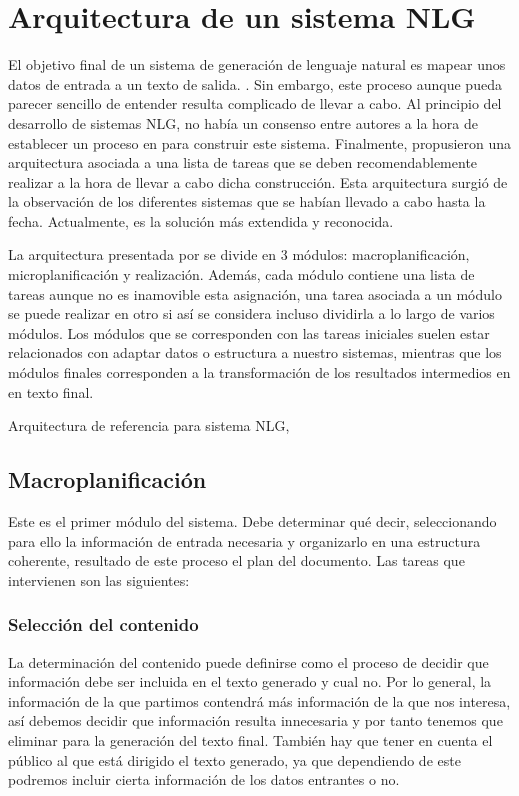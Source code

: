 \section{Arquitectura de un sistema NLG}
El objetivo final de un sistema de generación de lenguaje natural es mapear unos datos de entrada a un texto de salida. \citep{reiter1997building}. Sin embargo, este proceso aunque pueda parecer sencillo de entender resulta complicado de llevar a cabo. Al principio del desarrollo de sistemas NLG, no había un consenso entre autores a la hora de establecer un proceso en para construir este sistema. Finalmente, \cite{reiter1997building} propusieron una arquitectura asociada a una lista de tareas que se deben recomendablemente realizar a la hora de llevar a cabo dicha construcción. Esta arquitectura surgió de la observación de los diferentes sistemas que se habían llevado a cabo hasta la fecha.  Actualmente, es la solución más extendida y reconocida.

La arquitectura presentada por \cite{gatt2018survey} se divide en 3 módulos: macroplanificación, microplanificación y realización. Además, cada módulo contiene una lista de tareas aunque no es inamovible esta asignación, una tarea asociada a un módulo se puede realizar en otro si así se considera incluso dividirla a lo largo de varios módulos. Los módulos que se corresponden con las tareas iniciales suelen estar relacionados con adaptar datos o estructura a nuestro sistemas, mientras que los módulos finales corresponden a la transformación de los resultados intermedios en en texto final.

%
{Arquitectura de referencia para sistema NLG, \citet{vicente2015generacion}}

\subsection{Macroplanificación}
Este es el primer módulo del sistema. Debe determinar qué decir, seleccionando para ello la información de entrada necesaria y organizarlo en una estructura coherente, resultado de este proceso el plan del documento. Las tareas que
intervienen son las siguientes: 

\subsubsection{Selección del contenido}
La determinación del contenido puede definirse como el proceso de decidir que información debe ser incluida en el texto generado y cual no. Por lo general, la información de la que partimos contendrá más información de la que nos interesa, así debemos decidir que información resulta innecesaria y por tanto tenemos que eliminar para la generación del texto final. También hay que tener en cuenta el público al que está dirigido el texto generado, ya que dependiendo de este podremos incluir cierta información de los datos entrantes o no.

